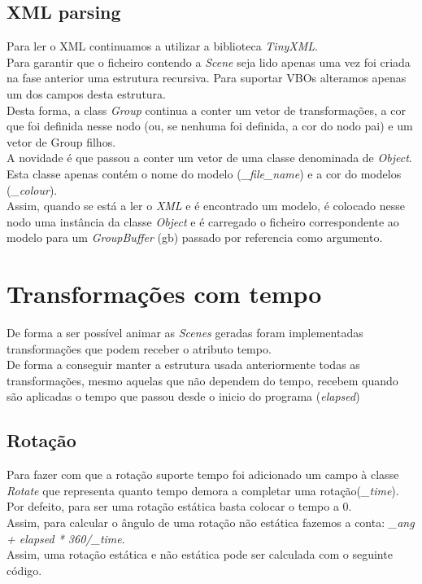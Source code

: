 \documentclass[a4paper]{report}
\begin{document}
\subsection{XML parsing}
Para ler o XML continuamos a utilizar a biblioteca \textit{TinyXML}.\\
Para garantir que o ficheiro contendo a \textit{Scene} seja lido apenas uma vez
foi criada na fase anterior uma estrutura recursiva. Para suportar VBOs
alteramos apenas um dos campos desta estrutura.\\
Desta forma, a class \textit{Group} continua a conter um vetor de
transformações, a cor que foi definida nesse nodo (ou, se nenhuma foi definida,
a cor do nodo pai) e um vetor de Group filhos.\\
A novidade é que passou a conter um vetor de uma classe denominada de
\textit{Object}. Esta classe apenas contém o nome do modelo
(\textit{\_file\_name}) e a cor do modelos (\textit{\_colour}).\\
Assim, quando se está a ler o \textit{XML} e é encontrado um modelo, é colocado
nesse nodo uma instância da classe \textit{Object} e é carregado o ficheiro
correspondente ao modelo para um \textit{GroupBuffer} (gb) passado por
referencia como argumento.



\section{Transformações com tempo}
De forma a ser possível animar as \textit{Scenes} geradas foram implementadas
transformações que podem receber o atributo tempo.\\
De forma a conseguir manter a estrutura usada anteriormente todas as
transformações, mesmo aquelas que não dependem do tempo, recebem quando são
aplicadas o tempo que passou desde o inicio do programa (\textit{elapsed})

\subsection{Rotação}
Para fazer com que a rotação suporte tempo foi adicionado um campo à classe
\textit{Rotate} que representa quanto tempo demora a completar uma
rotação(\textit{\_time}). Por defeito, para ser uma rotação estática basta
colocar o tempo a 0.\\
Assim, para calcular o ângulo de uma rotação não estática fazemos a conta:
\textit{\_ang + elapsed * 360/\_time}.\\
Assim, uma rotação estática e não estática pode ser calculada com o seguinte
código.
\end{document}
